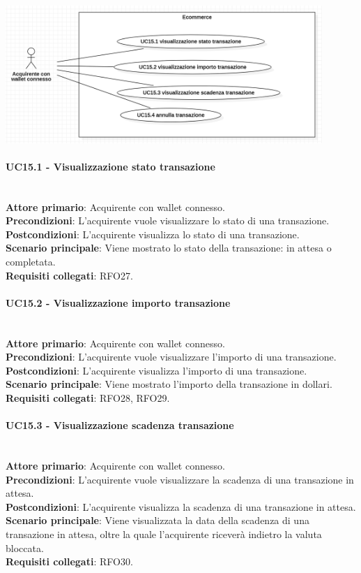 \documentclass[a4paper, 12pt]{article}
\begin{document}
\includegraphics[width=0.9\textwidth]{UC_ECA3}

\paragraph{UC15.1 - Visualizzazione stato transazione}\\
\textbf{Attore primario}: Acquirente con wallet connesso.\\
\textbf{Precondizioni}: L'acquirente vuole visualizzare lo stato di una transazione.\\
\textbf{Postcondizioni}: L'acquirente visualizza lo stato di una transazione.\\
\textbf{Scenario principale}: Viene mostrato lo stato della transazione: in attesa o completata.\\
\textbf{Requisiti collegati}: RFO27.

\paragraph{UC15.2 - Visualizzazione importo transazione}\\
\textbf{Attore primario}: Acquirente con wallet connesso.\\
\textbf{Precondizioni}: L'acquirente vuole visualizzare l'importo di una transazione.\\
\textbf{Postcondizioni}: L'acquirente visualizza l'importo di una transazione.\\
\textbf{Scenario principale}: Viene mostrato l'importo della transazione in dollari.\\
\textbf{Requisiti collegati}: RFO28, RFO29.

\paragraph{UC15.3 - Visualizzazione scadenza transazione}\\
\textbf{Attore primario}: Acquirente  con wallet connesso.\\
\textbf{Precondizioni}: L'acquirente vuole visualizzare la scadenza di una transazione in attesa.\\
\textbf{Postcondizioni}: L'acquirente visualizza la scadenza di una transazione in attesa.\\
\textbf{Scenario principale}: Viene visualizzata la data della scadenza di una transazione in attesa, oltre la quale l'acquirente riceverà indietro la valuta bloccata.\\
\textbf{Requisiti collegati}: RFO30.
\end{document}
